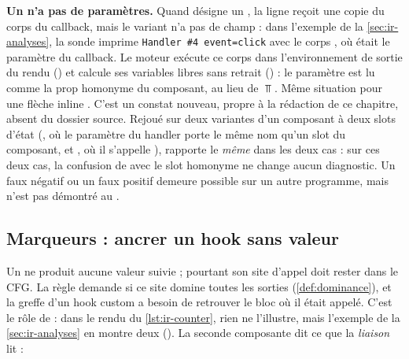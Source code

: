 
\begin{piege}
\textbf{Un  n'a pas de paramètres.} Quand  désigne un , la ligne  reçoit une copie du corps du callback, mais le variant n'a pas de champ  : dans l'exemple de la \cref{sec:ir-analyses}, la sonde imprime \texttt{Handler \#4 event=click} avec le corps , où  était le paramètre du callback. Le moteur exécute ce corps dans l'environnement de sortie du rendu () et calcule ses variables libres sans retrait () : le paramètre est lu comme la prop homonyme du composant, au lieu de $\Top$. Même situation pour une flèche inline . C'est un constat nouveau, propre à la rédaction de ce chapitre, absent du dossier source. Rejoué sur deux variantes d'un composant à deux slots d'état (, où le paramètre  du handler porte le même nom qu'un slot du composant, et , où il s'appelle ),  rapporte le \emph{même} \Warning{}  dans les deux cas : sur ces deux cas, la confusion de  avec le slot homonyme ne change aucun diagnostic. Un faux négatif ou un faux positif demeure possible sur un autre programme, mais n'est pas démontré au \snapshotCommit{}.
\end{piege}

\subsection{Marqueurs : ancrer un hook sans valeur}

Un  ne produit aucune valeur suivie ; pourtant son site d'appel doit rester dans le CFG. La règle  demande si ce site domine toutes les sorties (\cref{def:dominance}), et la greffe d'un hook custom a besoin de retrouver le bloc où il était appelé. C'est le rôle de  : dans le rendu du \cref{lst:ir-counter}, rien ne l'illustre, mais l'exemple de la \cref{sec:ir-analyses} en montre deux (). La seconde composante dit ce que la \emph{liaison} lit :


